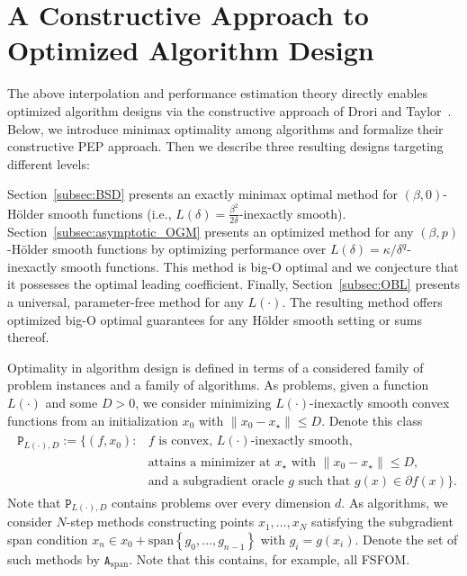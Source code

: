 \documentclass[11pt, hidelinks]{article}
\numberwithin{equation}{section}
\newcommand{\spann}[1]{\mathrm{span}\left\{{#1}\right\}}
\theoremstyle{thmstyletwo}%
\numberwithin{equation}{section}
\newcommand{\Holder}{H\"older }
\newcommand{\Algclass}[1]{\mathtt{A}_{\mathrm{{#1}}}}
\begin{document}
\section{A Constructive Approach to Optimized Algorithm Design}\label{sec:algo design}

The above interpolation and performance estimation theory directly enables optimized algorithm designs via the constructive approach of Drori and Taylor~\cite{constructive_approach}. Below, we introduce minimax optimality among algorithms and formalize their constructive PEP approach. Then we describe three resulting designs targeting different levels:

Section~\ref{subsec:BSD} presents an exactly minimax optimal method for $(\beta,0)$-\Holder smooth functions (i.e., $L(\delta) = \frac{\beta^2}{2\delta}$-inexactly smooth). Section~\ref{subsec:asymptotic_OGM} presents an optimized method for any $(\beta,p)$-\Holder smooth functions by optimizing performance over $L(\delta)=\kappa/\delta^q$-inexactly smooth functions. This method is big-O optimal and we conjecture that it possesses the optimal leading coefficient. Finally, Section~\ref{subsec:OBL} presents a universal, parameter-free method for any $L(\cdot)$.%
The resulting method offers optimized big-O optimal guarantees for any \Holder smooth setting or sums thereof.


Optimality in algorithm design is defined in terms of a considered family of problem instances and a family of algorithms. 
As problems, given a function $L(\cdot)$ and some $D>0$, we consider minimizing $L(\cdot)$-inexactly smooth convex functions from an initialization $x_0$ with $\|x_0-x_\star\|\leq D$. Denote this class
\begin{align}\label{def:problem_family}
\begin{split}
\mathtt{P}_{L(\cdot), D} := \{(f, x_0) \colon &f \text{ is convex, $L(\cdot)$-inexactly smooth}, \\ &\text{attains a minimizer at $x_\star$ with $\|x_0-x_\star\| \leq D,$}\\
&\text{and a subgradient oracle $g$ such that $g(x) \in \partial f(x)$}\}.
\end{split}
\end{align}
Note that $\mathtt{P}_{L(\cdot), D}$ contains problems over every dimension $d$. As algorithms, we consider $N$-step methods constructing points $x_1,\dots,x_N$ satisfying the subgradient span condition $ x_n \in x_0 + \spann{g_0, \dots, g_{n-1}}$ with $g_i=g(x_i)$. Denote the set of such methods by $\Algclass{span}$. Note that this contains, for example, all FSFOM. 
\end{document}
